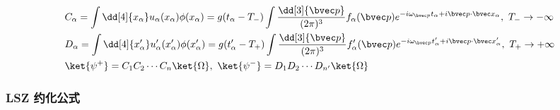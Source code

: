 \begin{equation}\begin{aligned}
&C_\alpha=\int \dd[4]{x_\alpha} u_\alpha(x_\alpha)\phi(x_\alpha)=g(t_\alpha-T_-)\int \frac{\dd[3]{\bvec p}}{(2\pi)^3} f_\alpha(\bvec p)e^{-i\omega_{\bvec p}t_\alpha+i\bvec p\cdot \bvec x_\alpha},\ T_-\rightarrow -\infty\\
&D_\alpha=\int \dd[4]{x'_\alpha} u'_\alpha(x'_\alpha)\phi(x'_\alpha)=g(t'_\alpha-T_+)\int \frac{\dd[3]{\bvec p}}{(2\pi)^3} f'_\alpha(\bvec p)e^{-i\omega_{\bvec p}t'_\alpha+i\bvec p\cdot \bvec x'_\alpha},\ T_+\rightarrow +\infty\\
&\ket{\psi^+}=C_1C_2\cdots C_n\ket{\Omega},\ \ket{\psi^-}=D_1D_2\cdots D_{n'}\ket{\Omega}\\
\end{aligned}\end{equation}
\subsubsection{LSZ 约化公式}


